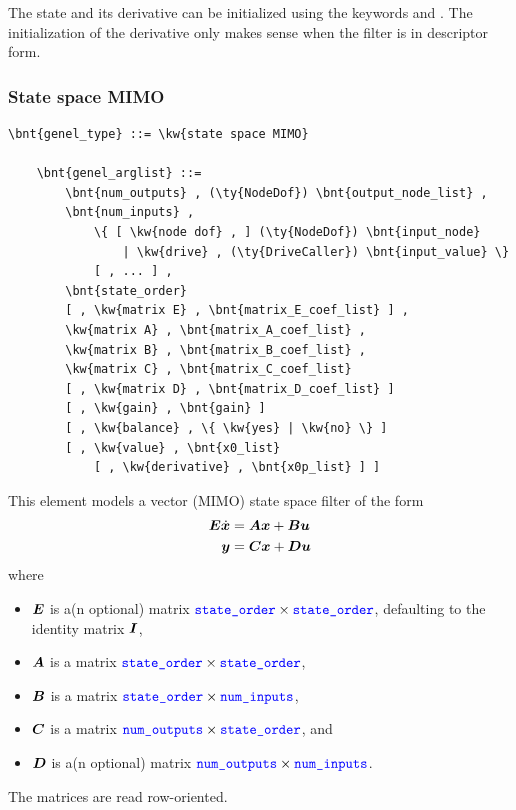 The state and its derivative can be initialized using the keywords 
and .
The initialization of the derivative only makes sense when the filter
is in descriptor form.

\subsubsection{State space MIMO}
\label{sec:EL:GENEL:STATE-SPACE-MIMO}
\begin{Verbatim}[commandchars=\\\{\}]
    \bnt{genel_type} ::= \kw{state space MIMO}

    \bnt{genel_arglist} ::=
        \bnt{num_outputs} , (\ty{NodeDof}) \bnt{output_node_list} ,
        \bnt{num_inputs} ,
            \{ [ \kw{node dof} , ] (\ty{NodeDof}) \bnt{input_node}
                | \kw{drive} , (\ty{DriveCaller}) \bnt{input_value} \}
            [ , ... ] ,
        \bnt{state_order}
        [ , \kw{matrix E} , \bnt{matrix_E_coef_list} ] ,
        \kw{matrix A} , \bnt{matrix_A_coef_list} ,
        \kw{matrix B} , \bnt{matrix_B_coef_list} ,
        \kw{matrix C} , \bnt{matrix_C_coef_list}
        [ , \kw{matrix D} , \bnt{matrix_D_coef_list} ]
        [ , \kw{gain} , \bnt{gain} ]
        [ , \kw{balance} , \{ \kw{yes} | \kw{no} \} ]
        [ , \kw{value} , \bnt{x0_list}
            [ , \kw{derivative} , \bnt{x0p_list} ] ]
\end{Verbatim}
This element models a vector (MIMO) state space filter of the form
\begin{align*}
        \boldsymbol{E} \dot{\boldsymbol{x}} &= \boldsymbol{A}\boldsymbol{x}+\boldsymbol{B}\boldsymbol{u} \\
	\boldsymbol{y} &= \boldsymbol{C}\boldsymbol{x}+\boldsymbol{D}\boldsymbol{u}
\end{align*}
where
\begin{itemize}
\item $\boldsymbol{E}$ is a(n optional) matrix
	$\textcolor{blue}{\texttt{state\_order}} \times \textcolor{blue}{\texttt{state\_order}}$, defaulting to the identity matrix $\boldsymbol{I}$,
\item $\boldsymbol{A}$ is a matrix
	$\textcolor{blue}{\texttt{state\_order}} \times \textcolor{blue}{\texttt{state\_order}}$,
\item $\boldsymbol{B}$ is a matrix
	$\textcolor{blue}{\texttt{state\_order}} \times \textcolor{blue}{\texttt{num\_inputs}}$,
\item $\boldsymbol{C}$ is a matrix
	$\textcolor{blue}{\texttt{num\_outputs}} \times \textcolor{blue}{\texttt{state\_order}}$, and
\item $\boldsymbol{D}$ is a(n optional) matrix
	$\textcolor{blue}{\texttt{num\_outputs}} \times \textcolor{blue}{\texttt{num\_inputs}}$.
\end{itemize}
The matrices are read row-oriented.

